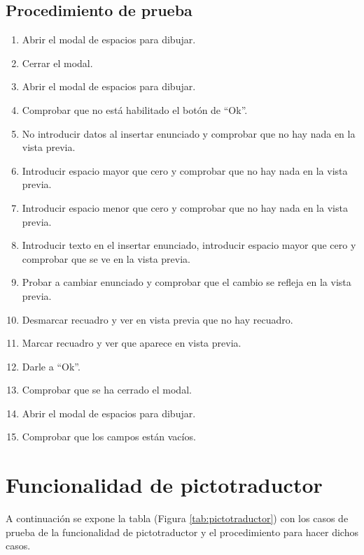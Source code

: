 \subsection{Procedimiento de prueba}
\label{procedimientoPruebas:dibujar}
\begin{enumerate}
    \item Abrir el modal de espacios para dibujar.
    \item Cerrar el modal.
    \item Abrir el modal de espacios para dibujar.
    \item Comprobar que no está habilitado el botón de ``Ok''.
    \item No introducir datos al insertar enunciado y comprobar que no hay nada en la vista previa. 
    \item Introducir espacio mayor que cero y comprobar que no hay nada en la vista previa.
    \item Introducir espacio menor que cero y comprobar que no hay nada en la vista previa.
    \item Introducir texto en el insertar enunciado, introducir espacio  mayor que cero y comprobar que se ve en la vista previa. 
    \item Probar a cambiar enunciado y comprobar que el cambio se refleja en la vista previa.
    \item Desmarcar recuadro y ver en vista previa que no hay recuadro.
    \item Marcar recuadro y ver que aparece en vista previa.
    \item Darle a ``Ok''.
    \item Comprobar que se ha cerrado el modal.
    \item Abrir el modal de  espacios para dibujar.
    \item Comprobar que los campos están vacíos. 
\end{enumerate}

\section{Funcionalidad de pictotraductor}
\label{planPruebas:pictotraductor}
A continuación se expone la tabla (Figura \ref{tab:pictotraductor}) con los casos de prueba de la funcionalidad de pictotraductor y el procedimiento para hacer dichos casos.

